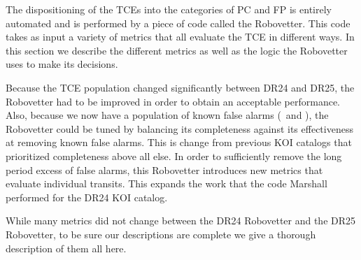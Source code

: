 \label{s:robovetter}
The dispositioning of the TCEs into the categories of PC and FP  is entirely automated and is performed by a piece of code called the Robovetter. This code takes as input a variety of metrics that all evaluate the TCE in different ways.  In this section we describe the different metrics as well as the logic the Robovetter uses to make its decisions. 

Because the TCE population changed significantly between DR24 and DR25, the Robovetter had to be improved in order to obtain an acceptable performance.  Also, because we now have a population of known false alarms (\invtce\ and \scrtce), the Robovetter could be tuned by balancing its completeness against its effectiveness at removing known false alarms. This is change from previous KOI catalogs that prioritized completeness above all else.  In order to sufficiently remove the long period excess of false alarms, this Robovetter introduces new metrics that evaluate individual transits. This expands the work that the code Marshall \citep{Mullally2015c} performed for the DR24 KOI catalog. 

While many metrics did not change between the DR24 Robovetter and the DR25 Robovetter, to be sure our descriptions are complete we give a thorough description of them all here. 




%  


